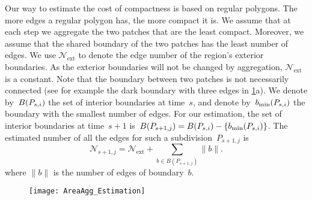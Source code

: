 \documentclass[acmsmall,natbib=false]{acmart}
\begin{document}
Our way to estimate the cost of compactness 
is based on regular polygons.
The more edges a regular polygon has, the more compact it is.
We assume that at each step 
we aggregate the two patches that are the least compact.
Moreover, we assume that the shared boundary of the two patches  has the least number of edges.
We use $\mathcal{N}_\mathrm{ext}$ to 
denote the edge number of the region's exterior boundaries.
As the exterior boundaries will not be changed by aggregation, 
$\mathcal{N}_\mathrm{ext}$ 
is a constant. 
%
Note that the boundary between two patches 
is not necessarily connected 
(see for example the dark boundary with three edges 
in \fig\ref{fig:AreaAgg_h_comp}a).
We denote by~$B(P_{s,i})$ 
the set of interior boundaries at time~$s$,
and denote by~$b_\mathrm{min}(P_{s,i})$ 
the boundary with the smallest number of edges.
For our estimation, the set of interior boundaries 
at time~$s+1$ 
is~$B(P_{s+1,j})= B(P_{s,i})-{\{b_\mathrm{min}(P_{s,i})\}}$. 
The estimated number of all the edges for 
such a subdivision~$P_{s+1,j}$ is
\begin{equation}
\label{eq:LeftEdgeNum}
\mathcal{N}_{s+1,j}=
\mathcal{N}_\mathrm{ext} + \sum_{b \in B(P_{s+1,j})} \|b\|.
\end{equation}
where $\|b\|$ is the number of edges of boundary~$b$.

\begin{figure*}[tb]
\centering
\texttt{[image: AreaAgg\_Estimation]}
\label{fig:AreaAgg_h_comp}
\end{figure*}
\end{document}
